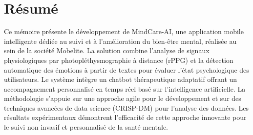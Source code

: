 \chapter*{Résumé} 

Ce mémoire présente le développement de MindCare-AI, une application mobile intelligente dédiée au suivi et à l'amélioration du bien-être mental, réalisée au sein de la société Mobelite. La solution combine l'analyse de signaux physiologiques par photopléthysmographie à distance (rPPG) et la détection automatique des émotions à partir de textes pour évaluer l'état psychologique des utilisateurs. Le système intègre un chatbot thérapeutique adaptatif offrant un accompagnement personnalisé en temps réel basé sur l'intelligence artificielle. La méthodologie s'appuie sur une approche agile pour le développement et sur des techniques avancées de data science (CRISP-DM) pour l'analyse des données. Les résultats expérimentaux démontrent l'efficacité de cette approche innovante pour le suivi non invasif et personnalisé de la santé mentale.